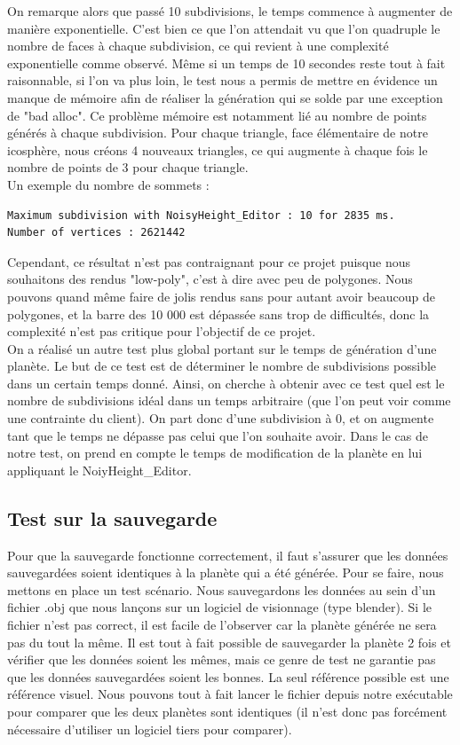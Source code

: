 \documentclass[a4paper]{article}
\begin{document}
On remarque alors que passé 10 subdivisions, le temps commence à augmenter de manière exponentielle. C'est bien ce que l'on attendait vu que l'on quadruple le nombre de faces à chaque subdivision, ce qui revient à une complexité exponentielle comme observé. Même si un temps de 10 secondes reste tout à fait raisonnable, si l'on va plus loin, le test nous a permis de mettre en évidence un manque de mémoire afin de réaliser la génération qui se solde par une exception de "bad alloc". Ce problème mémoire est notamment lié au nombre de points générés à chaque subdivision. Pour chaque triangle, face élémentaire de notre icosphère, nous créons 4 nouveaux triangles, ce qui augmente à chaque fois le nombre de points de 3 pour chaque triangle.\\

Un exemple du nombre de sommets :
\begin{lstlisting}[caption= Résultat des tests unitaires]
Maximum subdivision with NoisyHeight_Editor : 10 for 2835 ms.
Number of vertices : 2621442
\end{lstlisting}

Cependant, ce résultat n'est pas contraignant pour ce projet puisque nous souhaitons des rendus "low-poly", c'est à dire avec peu de polygones. Nous pouvons quand même faire de jolis rendus sans pour autant avoir beaucoup de polygones, et la barre des 10 000 est dépassée sans trop de difficultés, donc la complexité n'est pas critique pour l'objectif de ce projet.\\
\newpage
On a réalisé un autre test plus global portant sur le temps de génération d'une planète.
Le but de ce test est de déterminer le nombre de subdivisions possible dans un certain temps donné. Ainsi, on cherche à obtenir avec ce test quel est le nombre de subdivisions idéal dans un temps arbitraire (que l'on peut voir comme une contrainte du client). On part donc d'une subdivision à 0, et on augmente tant que le temps ne dépasse pas celui que l'on souhaite avoir. Dans le cas de notre test, on prend en compte le temps de modification de la planète en lui appliquant le NoiyHeight\_Editor.

\subsection{Test sur la sauvegarde}

Pour que la sauvegarde fonctionne correctement, il faut s'assurer que les données sauvegardées soient identiques à la planète qui a été générée. Pour se faire, nous mettons en place un test scénario. Nous sauvegardons les données au sein d'un fichier .obj que nous lançons sur un logiciel de visionnage (type blender). Si le fichier n'est pas correct, il est facile de l'observer car la planète générée ne sera pas du tout la même. Il est tout à fait possible de sauvegarder la planète 2 fois et vérifier que les données soient les mêmes, mais ce genre de test ne garantie pas que les données sauvegardées soient les bonnes. La seul référence possible est une référence visuel. Nous pouvons tout à fait lancer le fichier depuis notre exécutable pour comparer que les deux planètes sont identiques (il n'est donc pas forcément nécessaire d'utiliser un logiciel tiers pour comparer).
\end{document}
